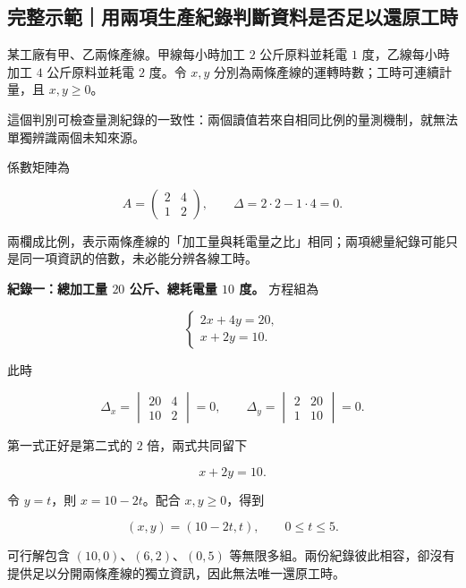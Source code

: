 \documentclass[11pt,a4paper]{article}
\begin{document}
\begin{HandoutWorkedExample}

\subsection{完整示範｜用兩項生產紀錄判斷資料是否足以還原工時}\label{ux5b8cux6574ux793aux7bc4ux7528ux5169ux9805ux751fux7522ux7d00ux9304ux5224ux65b7ux8cc7ux6599ux662fux5426ux8db3ux4ee5ux9084ux539fux5de5ux6642}

某工廠有甲、乙兩條產線。甲線每小時加工 \(2\) 公斤原料並耗電 \(1\) 度，乙線每小時加工 \(4\) 公斤原料並耗電 \(2\) 度。令 \(x,y\) 分別為兩條產線的運轉時數；工時可連續計量，且 \(x,y\ge0\)。

這個判別可檢查量測紀錄的一致性：兩個讀值若來自相同比例的量測機制，就無法單獨辨識兩個未知來源。

係數矩陣為

\[
A=
\begin{pmatrix}
2&4\\
1&2
\end{pmatrix},
\qquad
\Delta=2\cdot2-1\cdot4=0.
\]

兩欄成比例，表示兩條產線的「加工量與耗電量之比」相同；兩項總量紀錄可能只是同一項資訊的倍數，未必能分辨各線工時。

\textbf{紀錄一：總加工量 \(20\) 公斤、總耗電量 \(10\) 度。} 方程組為

\[
\begin{cases}
2x+4y=20,\\
x+2y=10.
\end{cases}
\]

此時

\[
\Delta_x=
\begin{vmatrix}
20&4\\
10&2
\end{vmatrix}=0,
\qquad
\Delta_y=
\begin{vmatrix}
2&20\\
1&10
\end{vmatrix}=0.
\]

第一式正好是第二式的 \(2\) 倍，兩式共同留下

\[
x+2y=10.
\]

令 \(y=t\)，則 \(x=10-2t\)。配合 \(x,y\ge0\)，得到

\[
\boxed{(x,y)=(10-2t,t),\qquad 0\le t\le5}.
\]

可行解包含 \((10,0)\)、\((6,2)\)、\((0,5)\) 等無限多組。兩份紀錄彼此相容，卻沒有提供足以分開兩條產線的獨立資訊，因此無法唯一還原工時。


\end{HandoutWorkedExample}
\end{document}

